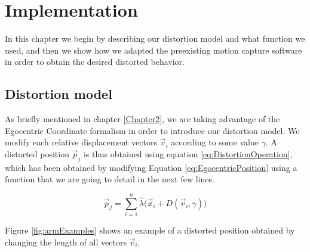 
\chapter{Implementation} %

\label{Chapter3} %

In this chapter we begin by describing our distortion model and what function we used, and then we show how we adapted the preexisting motion capture software in order to obtain the desired distorted behavior.

\section{Distortion model}


As briefly mentioned in chapter \ref{Chapter2}, we are taking advantage of the Egocentric Coordinate formalism in order to introduce our distortion model. We modify each relative displacement vectors $\vec{v}_i$ according to some value $\gamma$. A distorted position $\vec{p}_j$ is thus obtained using equation \ref{eq:DistortionOperation}, which has been obtained by modifying Equation \ref{eq:EgocentricPosition} using a function that we are going to detail in the next few lines.

\begin{equation}
\label{eq:DistortionOperation}
\vec{p}_j = \displaystyle\sum_{i=1}^{n} \hat{\lambda}\big(\vec{x}_i + D(\vec{v}_i,\gamma )\big)
\end{equation}

Figure \ref{fig:armExamples} shows an example of a distorted position obtained by changing the length of all vectors $\vec{v}_i$.

